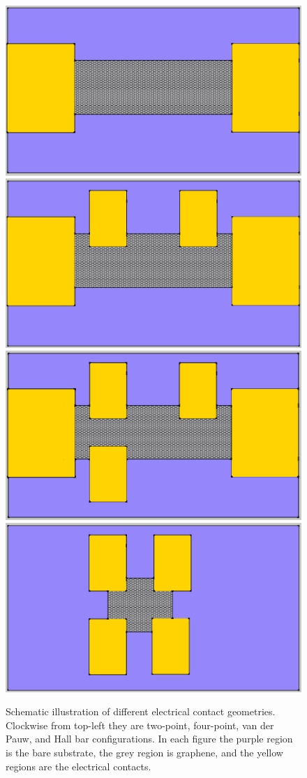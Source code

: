 \documentclass[edeposit,fullpage,draftthesis]{uiucthesis2009}
\begin{document}
         \begin{figure}
            \centering
            \includegraphics[width=0.4\linewidth]{images/experimentaltechniques/2pt-crop.png}
            \hspace{0.1\linewidth}
            \includegraphics[width=0.4\linewidth]{images/experimentaltechniques/4pt-crop.png}\\
            \vspace{0.04\linewidth}
            \includegraphics[width=0.4\linewidth]{images/experimentaltechniques/hallbar-crop.png}
            \hspace{0.1\linewidth}
            \includegraphics[width=0.4\linewidth]{images/experimentaltechniques/vdp-crop.png}\\
            \caption[Electronic contact configurations]{
                Schematic illustration of different electrical contact geometries. Clockwise from top-left
                they are two-point, four-point, van der Pauw, and Hall bar configurations. In each figure
                the purple region is the bare substrate, the grey region is graphene, and the yellow
                regions are the electrical contacts.
                }
            \label{fig:contact_config}
        \end{figure}
            
\end{document}
